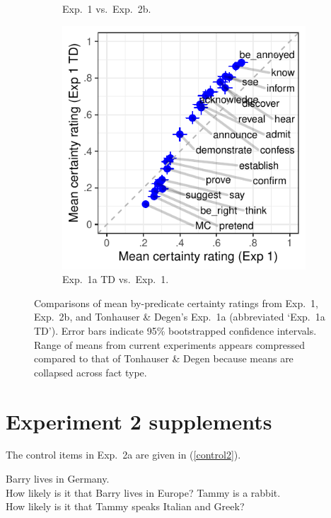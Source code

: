 \documentclass[11pt,fleqn]{article}
\newcommand{\6}{\mbox{$[\hspace*{-.6mm}[$}}
\newcommand{\9}{\mbox{$]\hspace*{-.6mm}]$}}
\begin{document}
\begin{figure}[h!]
\begin{subfigure}{.33\textwidth}
\caption{Exp.~1 vs.\ Exp.~2b.}
\label{f-projcomp2}
\end{subfigure}
\begin{subfigure}{.33\textwidth}
\includegraphics[width=\textwidth]{../../results/projection-comparisons/graphs/projection-comparison-59}
\caption{Exp.~1a TD vs.\  Exp.~1.}
\label{f-projcomp3}
\end{subfigure}
\caption{Comparisons of mean by-predicate certainty ratings from Exp.~1, Exp.~2b, and Tonhauser \& Degen's Exp.~1a (abbreviated `Exp.~1a TD'). Error bars indicate 95\% bootstrapped confidence intervals. Range of means from current experiments appears compressed compared to that of Tonhauser \& Degen because means are collapsed across fact type.}
\label{f-projection-comparisons}
\end{figure}

\section{Experiment 2 supplements}\label{a-exp2}

The control items in Exp.~2a are given in (\ref{control2}).

\begin{exe}
\ex\label{control2}
\begin{xlist}
 Barry lives in Germany. \\ How likely is it that Barry lives in Europe?
 Tammy is a rabbit. \\ How likely is it that Tammy speaks Italian and Greek?
\end{xlist}
\end{exe}
\end{document}
